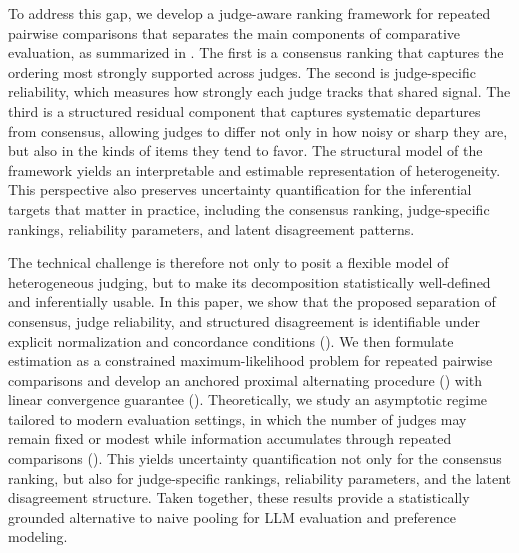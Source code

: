 \documentclass{article}
\begin{document}
\begin{bibunit}[unsrtnat]
To address this gap, we develop a judge-aware ranking framework for repeated pairwise comparisons that separates the main components of comparative evaluation, as summarized in . 
The first is a consensus ranking that captures the ordering most strongly supported across judges. The second is judge-specific reliability, which measures how strongly each judge tracks that shared signal. 
The third is a structured residual component that captures systematic departures from consensus, allowing judges to differ not only in how noisy or sharp they are, but also in the kinds of items they tend to favor. 
The structural model of the framework yields an interpretable and estimable representation of heterogeneity. 
This perspective also preserves uncertainty quantification for the inferential targets that matter in practice, including the consensus ranking, judge-specific rankings, reliability parameters, and latent disagreement patterns.

The technical challenge is therefore not only to posit a flexible model of heterogeneous judging, but to make its decomposition statistically well-defined and inferentially usable. In this paper, we show that the proposed separation of consensus, judge reliability, and structured disagreement is identifiable under explicit normalization and concordance conditions (). 
We then formulate estimation as a constrained maximum-likelihood problem for repeated pairwise comparisons and develop an anchored proximal alternating procedure () with linear convergence guarantee (). Theoretically, we study an asymptotic regime tailored to modern evaluation settings, in which the number of judges may remain fixed or modest while information accumulates through repeated comparisons (). 
This yields uncertainty quantification not only for the consensus ranking, but also for judge-specific rankings, reliability parameters, and the latent disagreement structure. Taken together, these results provide a statistically grounded alternative to naive pooling for LLM evaluation and preference modeling.



\end{bibunit}
\end{document}
